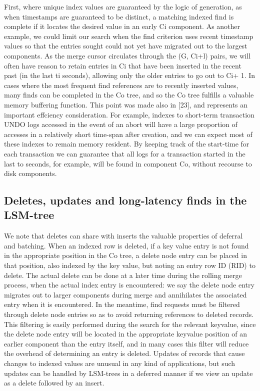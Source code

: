 \documentclass[a4paper,11pt,notitlepage,twoside,openright]{article}
\begin{document}
First, where unique index values are guaranteed by the logic of
generation, as when timestamps are guaranteed to be distinct, a matching
indexed find is complete if it locates the desired value in an early Ci
component. As another example, we could limit our search when the find
criterion uses recent timestamp values so that the entries sought could
not yet have migrated out to the largest components. As the merge cursor
circulates through the (G, Ci+l) pairs, we will often have reason to
retain entries in Ci that have been inserted in the recent past (in the
last ti seconds), allowing only the older entries to go out to Ci+ 1. In
cases where the most frequent find references are to recently inserted
values, many finds can be completed in the Co tree, and so the Co tree
fulfills a valuable memory buffering function. This point was made also
in {[}23{]}, and represents an important effciency consideration. For
example, indexes to short-term transaction UNDO logs accessed in the
event of an abort will have a large proportion of accesses in a
relatively short time-span after creation, and we can expect most of
these indexes to remain memory resident. By keeping track of the
start-time for each transaction we can guarantee that all logs for a
transaction started in the last to seconds, for example, will be found
in component Co, without recourse to disk components.


\hypertarget{deletes-updates-and-long-latency-finds-in-the-lsm-tree}{%
\subsection{Deletes, updates and long-latency finds in the
LSM-tree}\label{deletes-updates-and-long-latency-finds-in-the-lsm-tree}}


We note that deletes can share with inserts the valuable properties of
deferral and batching. When an indexed row is deleted, if a key value
entry is not found in the appropriate position in the Co tree, a delete
node entry can be placed in that position, also indexed by the key
value, but noting an entry row ID (RID) to delete. The actual delete can
be done at a later time during the rolling merge process, when the
actual index entry is encountered: we say the delete node entry migrates
out to larger components during merge and annihilates the associated
entry when it is encountered. In the meantime, find requests must be
filtered through delete node entries so as to avoid returning references
to deleted records. This filtering is easily performed during the search
for the relevant keyvalue, since the delete node entry will be located
in the appropriate keyvalue position of an earlier component than the
entry itself, and in many cases this filter will reduce the overhead of
determining an entry is deleted. Updates of records that cause changes
to indexed values are unusual in any kind of applications, but such
updates can be handled by LSM-trees in a deferred manner if we view an
update as a delete followed by an insert.
\end{document}
